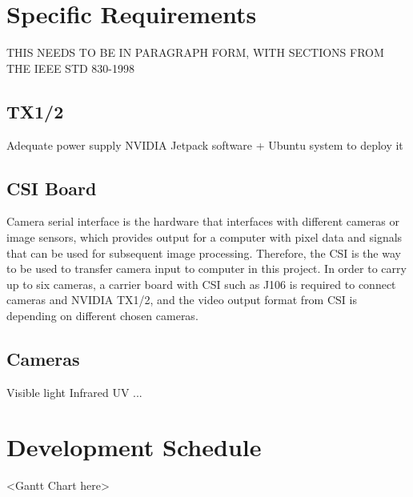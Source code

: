 \documentclass[letterpaper,10pt,serif,draftclsnofoot,onecolumn,compsoc,titlepage]{IEEEtran}
\begin{document}
\section{Specific Requirements}
THIS NEEDS TO BE IN PARAGRAPH FORM, WITH SECTIONS FROM THE IEEE STD 830-1998\\

\subsection{TX1/2}
		\subitem Adequate power supply
		\subitem NVIDIA Jetpack software + Ubuntu system to deploy it\\
\subsection{CSI Board}
		Camera serial interface is the hardware that interfaces with different cameras or image sensors, which provides output for a computer with pixel data and signals that can be used for subsequent image processing. Therefore, the CSI is the way to be used to transfer camera input to computer in this project.
		In order to carry up to six cameras, a carrier board with CSI such as J106 is required to connect cameras and NVIDIA TX1/2, and the video output format from CSI is depending on different chosen cameras.\\

\subsection{Cameras}
		\subitem Visible light
		\subitem Infrared
		\subitem UV
		\subitem ...\\

\section{Development Schedule}

<Gantt Chart here>\\
\end{document}
